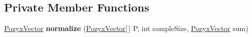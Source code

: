 \subsection*{Private Member Functions}
\begin{DoxyCompactItemize}
\item 
\mbox{\label{class_pozyx_positioner_1_1_framework_1_1_tag_ad660c4234e2e962b72737bff03665df9}} 
\hyperlink{struct_pozyx_positioner_1_1_framework_1_1_pozyx_vector}{Pozyx\+Vector} {\bfseries normalize} (\hyperlink{struct_pozyx_positioner_1_1_framework_1_1_pozyx_vector}{Pozyx\+Vector}\mbox{[}$\,$\mbox{]} P, int sample\+Size, \hyperlink{struct_pozyx_positioner_1_1_framework_1_1_pozyx_vector}{Pozyx\+Vector} sum)
\end{DoxyCompactItemize}

